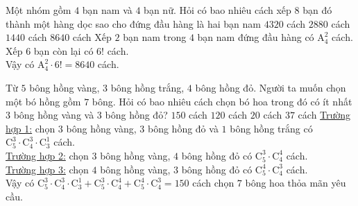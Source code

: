 \begin{ex}%
Một nhóm gồm $4$ bạn nam và $4$ bạn nữ. Hỏi có bao nhiêu cách xếp $8$ bạn đó thành một hàng dọc sao cho đứng đầu hàng là hai bạn nam
\choice
{$4320$ cách}
{$2880$ cách}
{$1440$ cách}
{\True $8640$ cách}
\loigiai
{
Xếp $2$ bạn nam trong $4$ bạn nam đứng đầu hàng có $\mathrm{A}_{4}^{2}$ cách. \\
Xếp $6$ bạn còn lại có $6!$ cách. \\
Vậy có $\mathrm{A}_{4}^{2}\cdot6!=8640$ cách.
}
\end{ex}

\begin{ex}%
Từ $5$ bông hồng vàng, $3$ bông hồng trắng, $4$ bông hồng đỏ. Người ta muốn chọn một bó hồng gồm $7$ bông. Hỏi có bao nhiêu cách chọn bó hoa trong đó có ít nhất $3$ bông hồng vàng và $3$ bông hồng đỏ?
\choice
{\True $150$ cách}
{$120$ cách}
{$20$ cách}
{$37$ cách}
\loigiai
{\underline{Trường hợp 1:} chọn $3$ bông hồng vàng, $3$ bông hồng đỏ và $1$ bông hồng trắng có $\mathrm{C}_5^3\cdot \mathrm{C}_4^3\cdot \mathrm{C}_3^1$ cách.\\
\underline{Trường hợp 2:} chọn $3$ bông hồng vàng, $4$ bông hồng đỏ có $\mathrm{C}_5^3\cdot \mathrm{C}_4^4$ cách.\\
\underline{Trường hợp 3:} chọn $4$ bông hồng vàng, $3$ bông hồng đỏ có $\mathrm{C}_5^4\cdot \mathrm{C}_4^3$ cách.\\
Vậy có $\mathrm{C}_5^3\cdot \mathrm{C}_4^3\cdot \mathrm{C}_3^1 + \mathrm{C}_5^3\cdot \mathrm{C}_4^4+\mathrm{C}_5^4\cdot \mathrm{C}_4^3=150$ cách chọn $7$ bông hoa thỏa mãn yêu cầu.
}
\end{ex}

